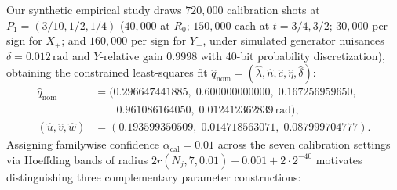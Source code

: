 \documentclass[11pt,letterpaper]{article}
\theoremstyle{definition}
\begin{document}
Our synthetic empirical study draws \(720{,}000\) calibration shots at
\(P_1 = (3/10, 1/2, 1/4)\) (\(40{,}000\) at \(R_0\); \(150{,}000\) each
at \(t = 3/4, 3/2\); \(30{,}000\) per sign for \(X_\pm\); and
\(160{,}000\) per sign for \(Y_\pm\), under simulated generator
nuisances \(\delta = 0.012\,\mathrm{rad}\) and \(Y\)-relative gain
\(0.9998\) with 40-bit probability discretization), obtaining the
constrained least-squares fit
\(\hat{q}_{\mathrm{nom}} = (\hat{\lambda}, \hat{n}, \hat{c}, \hat{\eta}, \hat{\delta})\):
\[\begin{aligned}
\hat{q}_{\mathrm{nom}} &= (0.296647441885,\; 0.600000000000,\; 0.167256959650,\\
&\qquad 0.961086164050,\; 0.012412362839\,\mathrm{rad}), \\
(\hat{u}, \hat{v}, \hat{w}) &= (0.193599350509,\; 0.014718563071,\; 0.087999704777).
\end{aligned}\] Assigning familywise confidence
\(\alpha_{\mathrm{cal}} = 0.01\) across the seven calibration settings
via Hoeffding bands of radius
\(2r(N_j, 7, 0.01) + 0.001 + 2\cdot 2^{-40}\) motivates distinguishing
three complementary parameter constructions:
\end{document}
